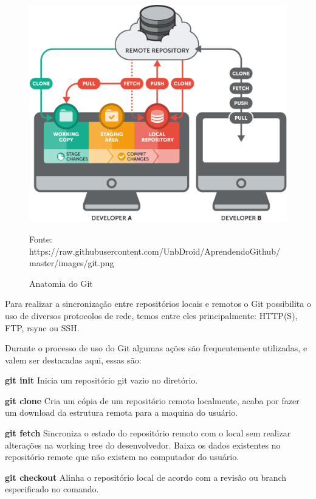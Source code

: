 \documentclass[]{politex}
\newcommand{\legend}[1]{\begin{center}\def\caption{}\caption{#1}\end{center}}
\begin{document}
	\begin{figure}[!htbp]
		\caption{\label{fig_git1}Anatomia do Git}
		\begin{center}
		\includegraphics[scale=0.4]{git.png}
		\end{center}
		\legend{Fonte: https://raw.githubusercontent.com/UnbDroid/AprendendoGithub/master/images/git.png}
	\end{figure}
	
	Para realizar a sincronização entre repositórios locais e remotos o Git possibilita o uso de diversos protocolos de rede, temos entre eles principalmente: HTTP(S), FTP, rsync ou SSH.
	
	Durante o processo de uso do Git algumas ações são frequentemente utilizadas, e valem ser destacadas aqui, essas são:
	
	\textbf{git init}
	\newline
	Inicia um repositório git vazio no diretório.
	
	\textbf{git clone}
	\newline
	Cria um cópia de um repositório remoto localmente, acaba por fazer um download da estrutura remota para a maquina do usuário.
	
	\textbf{git fetch}
	\newline
	Sincroniza o estado do repositório remoto com o local sem realizar alterações na working tree do desenvolvedor. Baixa os dados existentes no repositório remote que não existem no computador do usuário.
	
	\textbf{git checkout}
	\newline
	Alinha o repositório local de acordo com a revisão ou branch especificado no comando.
	
\end{document}
